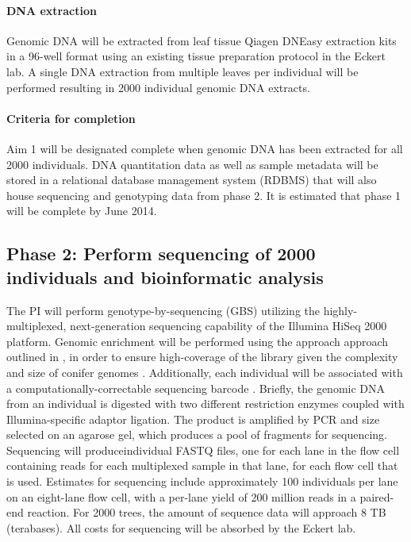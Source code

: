 \paragraph{DNA extraction}
Genomic DNA will be extracted from leaf tissue Qiagen DNEasy extraction kits in a 96-well format using an existing tissue preparation
protocol in the Eckert lab.  A single DNA extraction from multiple leaves per individual will be performed resulting in \num{2000} 
individual genomic DNA extracts.  

\paragraph{Criteria for completion}
Aim 1 will be designated complete when genomic DNA has been extracted for all \num{2000} individuals.  DNA quantitation data as well 
as sample metadata will be stored in a relational database management system (RDBMS) that will also house sequencing and 
genotyping data from phase 2.  It is estimated that phase 1 will be complete by June 2014.

\subsection*{Phase 2: Perform sequencing of 2000 individuals and bioinformatic analysis}

The PI will perform genotype-by-sequencing (GBS) utilizing the highly-multiplexed, next-generation sequencing capability of the 
Illumina HiSeq 2000 platform.  Genomic enrichment will be performed using the approach approach outlined in 
\cite{Parchman:2012ca}, in order to ensure high-coverage of the library given the complexity and size of conifer genomes 
\citep{Mackay:2012hr}.  Additionally, each individual will be associated with a computationally-correctable sequencing 
barcode \citep{Roche454MID}.  
Briefly, the genomic DNA from an individual is digested with two different restriction enzymes coupled with Illumina-specific 
adaptor ligation.  The product is amplified by PCR and size selected on an agarose gel, which produces a pool of fragments for 
sequencing.  Sequencing will produceindividual FASTQ files, one for each lane in the flow cell containing reads for each multiplexed 
sample in that lane, for each flow cell that is used.  Estimates for sequencing include approximately 100 individuals per lane on an 
eight-lane flow cell, with a per-lane yield of 200 million reads in a paired-end reaction.  For 2000 trees, the amount of sequence data 
will approach 8 TB (terabases).  All costs for sequencing will be absorbed by the Eckert lab.   

